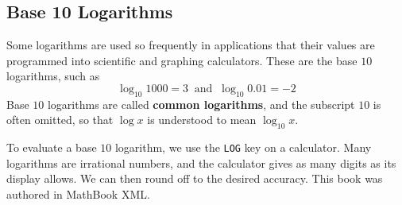 \documentclass[10pt,]{book}
\newcommand{\terminology}[1]{\textbf{#1}}
\theoremstyle{plain}
\theoremstyle{definition}
\theoremstyle{definition}
\theoremstyle{definition}
\theoremstyle{definition}
\theoremstyle{definition}
\numberwithin{equation}{section}
\begin{document}
\subsection[Base 10 Logarithms]{Base 10 Logarithms}\label{subsection-98}

	Some logarithms are used so frequently in applications that their values are programmed into scientific and graphing calculators. These are the base \(10\) logarithms, such as 
	\begin{equation*}\log_{10}{1000} = 3 ~\text{ and }~ \log_{10}{0.01} = −2\end{equation*}
	Base \(10\) logarithms are called \terminology{common logarithms}, and the subscript \(10\) is often omitted, so that \(\log x\) is understood to mean \(\log_{10}{x}\).
%
\par

	To evaluate a base \(10\) logarithm, we use the \lstinline?LOG? key on a calculator. Many logarithms are irrational numbers, and the calculator gives as many digits as its display allows. We can then round off to the desired accuracy.
%
%
\printindex
%
This book was authored in MathBook XML.%
\end{document}
